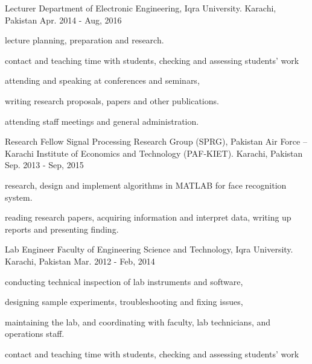 \begin{cventries}
  \cventry
    {Lecturer} %
    {Department of Electronic Engineering, Iqra University.} %
    {Karachi, Pakistan} %
    {Apr. 2014 - Aug, 2016} %
    {
     \begin{cvitems} %
        \item {lecture planning, preparation and research.}
        \item {contact and teaching time with students, checking and assessing students' work}
        \item {attending and speaking at conferences and seminars,}
        \item {writing research proposals, papers and other publications.}
        \item{attending staff meetings and general administration.}
     \end{cvitems}
    }


  \cventry
    {Research Fellow} %
    {Signal Processing Research Group (SPRG), Pakistan Air Force – Karachi Institute of Economics and Technology (PAF-KIET).} %
    {Karachi, Pakistan} %
    {Sep. 2013 - Sep, 2015} %
    {
      \begin{cvitems} %
        \item {research, design and implement algorithms in MATLAB for face recognition system.}
        \item {reading research papers, acquiring information and interpret data, writing up reports and presenting finding.}
      \end{cvitems}
    }
    
  \cventry
    {Lab Engineer} %
    {Faculty of Engineering Science and Technology, Iqra University.} %
    {Karachi, Pakistan} %
    {Mar. 2012 - Feb, 2014} %
    {
     \begin{cvitems} %
        \item {conducting technical inspection of lab instruments and software,}
        \item {designing sample experiments, troubleshooting and fixing issues,}
        \item {maintaining the lab, and coordinating with faculty, lab technicians, and operations staff.}
        \item {contact and teaching time with students, checking and assessing students' work}
     \end{cvitems}
    }    
    

\end{cventries}
